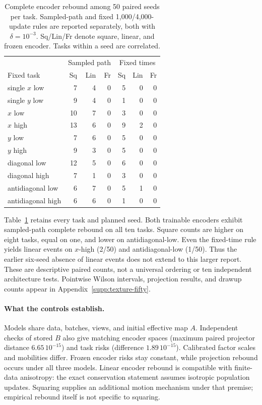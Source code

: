 \begin{table}[t]
\centering\small
\caption{Complete encoder rebound among 50 paired seeds per task. Sampled-path and fixed 1,000/4,000-update rules are reported separately, both with $\delta=10^{-3}$. Sq/Lin/Fr denote square, linear, and frozen encoder. Tasks within a seed are correlated.}
\label{main:rebound-counts}
\setlength{\tabcolsep}{3pt}
\begin{tabular}{lrrrrrr}
\toprule
&\multicolumn{3}{c}{Sampled path}&\multicolumn{3}{c}{Fixed times}\\
Fixed task&Sq&Lin&Fr&Sq&Lin&Fr\\\midrule
single $x$ low&7&4&0&5&0&0\\
single $y$ low&9&4&0&1&0&0\\
$x$ low&10&7&0&3&0&0\\
$x$ high&13&6&0&9&2&0\\
$y$ low&7&6&0&5&0&0\\
$y$ high&9&3&0&5&0&0\\
diagonal low&12&5&0&6&0&0\\
diagonal high&7&1&0&3&0&0\\
antidiagonal low&6&7&0&5&1&0\\
antidiagonal high&6&6&0&1&0&0\\\bottomrule
\end{tabular}
\end{table}

Table~\ref{main:rebound-counts} retains every task and planned seed. Both trainable encoders exhibit sampled-path complete rebound on all ten tasks. Square counts are higher on eight tasks, equal on one, and lower on antidiagonal-low. Even the fixed-time rule yields linear events on $x$-high (2/50) and antidiagonal-low (1/50). Thus the earlier six-seed absence of linear events does not extend to this larger report. These are descriptive paired counts, not a universal ordering or ten independent architecture tests. Pointwise Wilson intervals, projection results, and drawup counts appear in Appendix~\ref{supp:texture-fifty}.

\paragraph{What the controls establish.}
Models share data, batches, views, and initial effective map $A$. Independent checks of stored $B$ also give matching encoder spaces (maximum paired projector distance $6.65\,10^{-15}$) and task risks (difference $1.89\,10^{-15}$). Calibrated factor scales and mobilities differ. Frozen encoder risks stay constant, while projection rebound occurs under all three models. Linear encoder rebound is compatible with finite-data anisotropy: the exact conservation statement assumes isotropic population updates. Squaring supplies an additional motion mechanism under that premise; empirical rebound itself is not specific to squaring.

